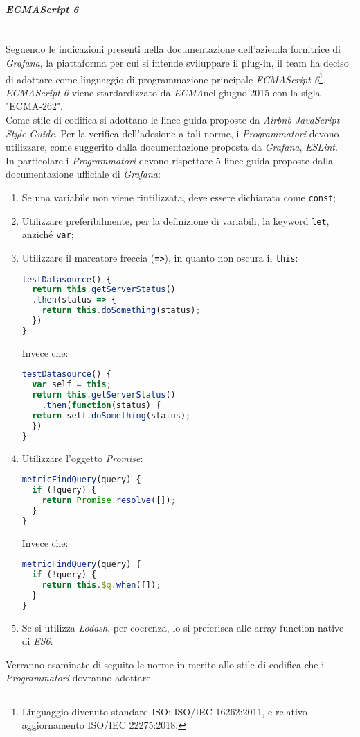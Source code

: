 \paragraph{\textit{ECMAScript 6}}\label{EcmaScript6} \-\\
Seguendo le indicazioni presenti nella documentazione dell'azienda fornitrice di \textit{Grafana}, la piattaforma  per cui si intende sviluppare il plug-in, il team ha deciso di adottare come linguaggio di programmazione principale \textit{ECMAScript 6}\footnote{Linguaggio divenuto standard ISO: ISO/IEC 16262:2011, e relativo aggiornamento ISO/IEC 22275:2018.}.\\
\textit{ECMAScript 6} viene stardardizzato da \textit{ECMA}\glossario nel giugno 2015 con la sigla "ECMA-262".\\
Come stile di codifica si adottano le linee guida proposte da \textit{Airbnb JavaScript Style Guide}. Per la verifica dell'adesione a tali norme, i \textit{Programmatori} devono utilizzare, come suggerito dalla documentazione proposta da \textit{Grafana}, \textit{ESLint}\glossario.\\
In particolare i \textit{Programmatori} devono rispettare 5 linee guida proposte dalla documentazione ufficiale di \textit{Grafana}:
\begin{enumerate}
	\item Se una variabile non viene riutilizzata, deve essere dichiarata come \texttt{const};
	\item Utilizzare preferibilmente, per la definizione di variabili, la keyword  \texttt{let}, anziché  \texttt{var};
	\item Utilizzare il marcatore freccia (\texttt{\textbf{=>}}), in quanto non oscura il \texttt{this}:
	\begin{lstlisting}[language=JavaScript]
testDatasource() {
  return this.getServerStatus()
  .then(status => {
    return this.doSomething(status);
  })
}	
	\end{lstlisting}
	Invece che:
	\begin{lstlisting}[language=JavaScript]
testDatasource() {
  var self = this;
  return this.getServerStatus()
    .then(function(status) {
  return self.doSomething(status);
  })
}
	\end{lstlisting}
	\item Utilizzare l'oggetto \textit{Promise}:
	\begin{lstlisting}[language=JavaScript]
metricFindQuery(query) {
  if (!query) {
    return Promise.resolve([]);
  }
}	
	\end{lstlisting}
	Invece che:
	\begin{lstlisting}[language=JavaScript]
metricFindQuery(query) {
  if (!query) {
    return this.$q.when([]);
  }
}
	\end{lstlisting}
	\item Se si utilizza \textit{Lodash}\glossario, per coerenza, lo si preferisca alle array function native di \textit{ES6}.
\end{enumerate}
Verranno esaminate di seguito le norme in merito allo stile di codifica che i \textit{Programmatori} dovranno adottare.


